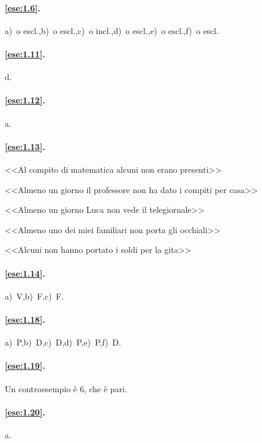 \paragraph{\ref{ese:1.6}.}
a)~o escl\@.,\quad b)~o escl\@.,\quad c)~o incl\@.,\quad d)~o 
escl\@.,\quad e)~o escl\@.,\quad f)~o escl.

\paragraph{\ref{ese:1.11}.}
d.

\paragraph{\ref{ese:1.12}.}
a.

\paragraph{\ref{ese:1.13}.}
\begin{enumeratea}
\item <<Al compito di matematica alcuni non erano presenti>>
\item <<Almeno un giorno il professore non ha dato i compiti per 
casa>>
\item <<Almeno un giorno Luca non vede il telegiornale>>
\item <<Almeno uno dei miei familiari non porta gli occhiali>>
\item <<Alcuni non hanno portato i soldi per la gita>>
\end{enumeratea}

\paragraph{\ref{ese:1.14}.}
a)~V,\quad b)~F,\quad c)~F.

\paragraph{\ref{ese:1.18}.}
a)~P,\quad b)~D,\quad c)~D,\quad d)~P,\quad e)~P,\quad f)~D.

\paragraph{\ref{ese:1.19}.}
Un controesempio è 6, che è pari.

\paragraph{\ref{ese:1.20}.}
a.


